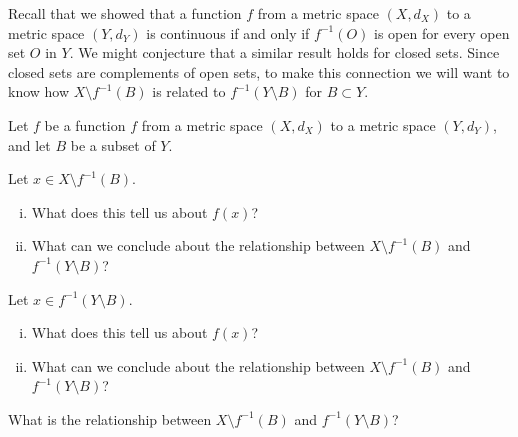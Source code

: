 Recall that we showed that a function $f$ from a metric space $(X,d_X)$ to a metric space $(Y,d_Y)$ is continuous if and only if $f^{-1}(O)$ is open for every open set $O$ in $Y$. We might conjecture that a similar result holds for closed sets. Since closed sets are complements of open sets, to make this connection we will want to know how $X \setminus f^{-1}(B)$ is related to $f^{-1}(Y \setminus B)$ for $B \subset Y$. 

\begin{activity} \label{act:CS_1} Let $f$ be a function $f$ from a metric space $(X,d_X)$ to a metric space $(Y,d_Y)$, and let $B$ be a subset of $Y$.
\ba
\item Let $x \in X \setminus f^{-1}(B)$.
	\begin{enumerate}[i.]
	\item What does this tell us about $f(x)$?

	\item What can we conclude about the relationship between $X \setminus f^{-1}(B)$ and $f^{-1}(Y \setminus B)$?
		
	\end{enumerate}
	
\item Let $x \in f^{-1}(Y \setminus B)$.
	\begin{enumerate}[i.]
	\item What does this tell us about $f(x)$?

	\item What can we conclude about the relationship between $X \setminus f^{-1}(B)$ and $f^{-1}(Y \setminus B)$?
		
	\end{enumerate}	

	\item What is the relationship between $X \setminus f^{-1}(B)$ and $f^{-1}(Y \setminus B)$?
	
\ea

\end{activity}

